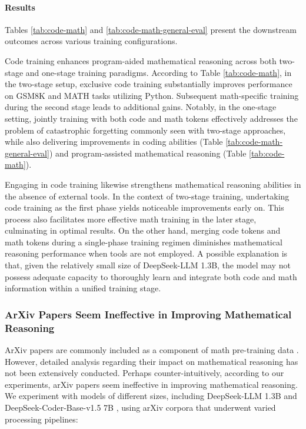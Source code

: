 \begin{itemize}[topsep=0pt]
\paragraph{Results}
Tables \ref{tab:code-math} and \ref{tab:code-math-general-eval} present the downstream outcomes across various training configurations.

Code training enhances program-aided mathematical reasoning across both two-stage and one-stage training paradigms. According to Table \ref{tab:code-math}, in the two-stage setup, exclusive code training substantially improves performance on GSM8K and MATH tasks utilizing Python. Subsequent math-specific training during the second stage leads to additional gains. Notably, in the one-stage setting, jointly training with both code and math tokens effectively addresses the problem of catastrophic forgetting commonly seen with two-stage approaches, while also delivering improvements in coding abilities (Table \ref{tab:code-math-general-eval}) and program-assisted mathematical reasoning (Table \ref{tab:code-math}).

Engaging in code training likewise strengthens mathematical reasoning abilities in the absence of external tools. In the context of two-stage training, undertaking code training as the first phase yields noticeable improvements early on. This process also facilitates more effective math training in the later stage, culminating in optimal results. On the other hand, merging code tokens and math tokens during a single-phase training regimen diminishes mathematical reasoning performance when tools are not employed. A possible explanation is that, given the relatively small size of DeepSeek-LLM 1.3B, the model may not possess adequate capacity to thoroughly learn and integrate both code and math information within a unified training stage.

\subsubsection{ArXiv Papers Seem Ineffective in Improving Mathematical Reasoning}

ArXiv papers are commonly included as a component of math pre-training data \citep{minerva,gpt-f,llemma,mathpile}. However, detailed analysis regarding their impact on mathematical reasoning has not been extensively conducted. Perhaps counter-intuitively, according to our experiments, arXiv papers seem ineffective in improving mathematical reasoning. We experiment with models of different sizes, including DeepSeek-LLM 1.3B and DeepSeek-Coder-Base-v1.5 7B \citep{deepseek-coder}, using arXiv corpora that underwent varied processing pipelines:


\end{itemize}
